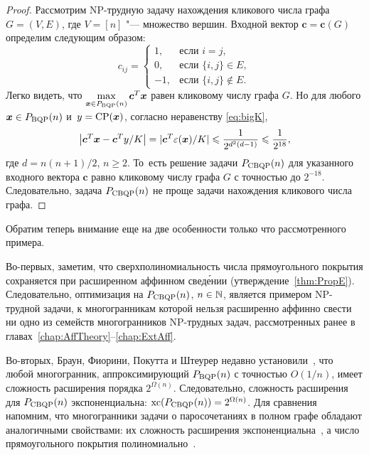 \begin{proof}
	Рассмотрим NP-трудную задачу нахождения кликового числа графа $G=(V, E)$, 
	где $V = [n]$ "--- множество вершин.
	Входной вектор $\bm{c} = \bm{c}(G)$ определим следующим образом:
	\[
	c_{ij} = \begin{cases}
	1, & \text{если } i=j,\\
	0, & \text{если } \{i,j\} \in E,\\
	-1, & \text{если } \{i,j\} \not\in E.
	\end{cases}
	\]
	Легко видеть, что $\max\limits_{\bm{x}\in P_{\textup{BQP}}(n)} \bm{c}^T \bm{x}$	равен кликовому числу графа $G$.
	Но для любого $\bm{x} \in P_{\textup{BQP}}(n)$ и~$y = \textup{CP}(\bm{x})$, 
	согласно неравенству \eqref{eq:bigK},
	\begin{equation*}
	\left|\bm{c}^T \bm{x} - \bm{c}^T y / K\right| = |\bm{c}^T \varepsilon(\bm{x}) / K|
	\leqslant \frac{1}{2^{d^2(d-1)}} \leqslant \frac{1}{2^{18}},
	\end{equation*}
	где $d = n(n+1)/2$, $n \ge 2$.
	То~есть решение задачи $P_{\textup{CBQP}}(n)$ для указанного входного вектора $\bm{c}$
	равно кликовому числу графа $G$ с точностью до $2^{-18}$.
	Следовательно, задача $P_{\textup{CBQP}}(n)$ не проще задачи нахождения кликового числа графа.
\end{proof}

Обратим теперь внимание еще на две особенности только что рассмотренного примера.

Во-первых, заметим, что сверхполиномиальность числа прямоугольного покрытия сохраняется при расширенном аффинном свед\'{е}нии (утверждение~\ref{thm:PropE}).
Следовательно, оптимизация на $P_{\textup{CBQP}}(n)$, $n \in \mathbb{N}$, является примером NP-трудной задачи, к многогранникам которой нельзя расширенно аффинно свести ни одно из семейств многогранников NP-трудных задач, рассмотренных ранее в главах~\ref{chap:AffTheory}--\ref{chap:ExtAff}.

Во-вторых, Браун, Фиорини, Покутта и Штеурер недавно установили~\cite[Theorem~4]{Braun:2015}, что любой многогранник, аппроксимирующий $P_{\textup{BQP}}(n)$ с точностью $O(1/n)$, имеет сложность расширения порядка $2^{\Omega(n)}$.
Следовательно, сложность расширения для $P_{\textup{CBQP}}(n)$ экспоненциальна: $\operatorname{xc}(P_{\textup{CBQP}}(n)) = 2^{\Omega(n)}$.
Для сравнения напомним, что многогранники задачи о паросочетаниях в полном графе обладают аналогичными свойствами: их сложность расширения экспоненциальна~\cite{Rothvoss:2014}, а число прямоугольного покрытия полиномиально~\cite{FioriniKPT:13}. 


